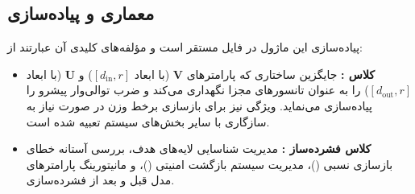 \subsection{معماری و پیاده‌سازی}
پیاده‌سازی این ماژول در فایل  مستقر است و مؤلفه‌های کلیدی آن عبارتند از:
\begin{itemize}
    \item \textbf{کلاس :} جایگزین ساختاری  که پارامترهای $\mathbf{V}$ (با ابعاد $[d_{\text{in}}, r]$) و $\mathbf{U}$ (با ابعاد $[d_{\text{out}}, r]$) را به عنوان تانسورهای مجزا نگهداری می‌کند و ضرب توالی‌وار پیشرو را پیاده‌سازی می‌نماید. ویژگی  نیز برای بازسازی برخط وزن در صورت نیاز به سازگاری با سایر بخش‌های سیستم تعبیه شده است.
    \item \textbf{کلاس فشرده‌ساز :} مدیریت شناسایی لایه‌های هدف، بررسی آستانه خطای بازسازی نسبی ()، مدیریت سیستم بازگشت امنیتی ()، و مانیتورینگ پارامترهای مدل قبل و بعد از فشرده‌سازی.
\end{itemize}
